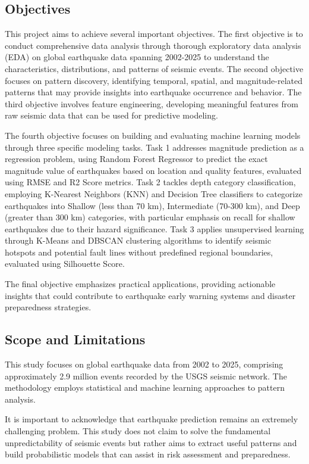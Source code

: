 \subsection{Objectives}

This project aims to achieve several important objectives. The first objective is to conduct comprehensive data analysis through thorough exploratory data analysis (EDA) on global earthquake data spanning 2002-2025 to understand the characteristics, distributions, and patterns of seismic events. The second objective focuses on pattern discovery, identifying temporal, spatial, and magnitude-related patterns that may provide insights into earthquake occurrence and behavior. The third objective involves feature engineering, developing meaningful features from raw seismic data that can be used for predictive modeling.

The fourth objective focuses on building and evaluating machine learning models through three specific modeling tasks. Task 1 addresses magnitude prediction as a regression problem, using Random Forest Regressor to predict the exact magnitude value of earthquakes based on location and quality features, evaluated using RMSE and R2 Score metrics. Task 2 tackles depth category classification, employing K-Nearest Neighbors (KNN) and Decision Tree classifiers to categorize earthquakes into Shallow (less than 70 km), Intermediate (70-300 km), and Deep (greater than 300 km) categories, with particular emphasis on recall for shallow earthquakes due to their hazard significance. Task 3 applies unsupervised learning through K-Means and DBSCAN clustering algorithms to identify seismic hotspots and potential fault lines without predefined regional boundaries, evaluated using Silhouette Score.

The final objective emphasizes practical applications, providing actionable insights that could contribute to earthquake early warning systems and disaster preparedness strategies.

\subsection{Scope and Limitations}

This study focuses on global earthquake data from 2002 to 2025, comprising approximately 2.9 million events recorded by the USGS seismic network. The methodology employs statistical and machine learning approaches to pattern analysis.

It is important to acknowledge that earthquake prediction remains an extremely challenging problem. This study does not claim to solve the fundamental unpredictability of seismic events but rather aims to extract useful patterns and build probabilistic models that can assist in risk assessment and preparedness.

